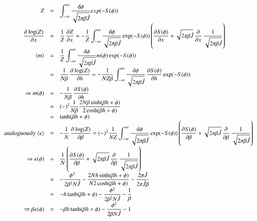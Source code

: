 \documentclass{scrartcl}
\begin{document}
\[\begin{array}{>{\displaystyle}r>{\displaystyle}c>{\displaystyle}l}

Z&=&\int_{-\infty}^{\infty}\frac{\mathrm{d} \phi}{\sqrt{2\pi\beta\hat{J}}}exp(-S(\phi))\\


\dpd{\log(Z)}{x}&=&\frac{1}{Z}\dpd{Z}{x}=
-\frac{1}{Z}\int_{-\infty}^{\infty}\frac{\mathrm{d} \phi}{\sqrt{2\pi\beta\hat{J}}}\exp(-S(\phi))\left( \dpd{S(\phi)}{x}+\sqrt{2\pi\beta\hat{J}}\dpd{}{x}\frac{1}{\sqrt{2\pi\beta\hat{J}}}\right) \\

\langle m\rangle&=&\frac{1}{Z}\int_{-\infty}^{\infty}\frac{\mathrm{d} \phi}{\sqrt{2\pi\beta\hat{J}}}m(\phi)\exp(-S(\phi))\\
&=&\frac{1}{N\beta}\dpd{\log(Z)}{h}=
-\frac{1}{NZ\beta}\int_{-\infty}^{\infty}\frac{\mathrm{d} \phi}{\sqrt{2\pi\beta\hat{J}}}\dpd{S(\phi)}{h}\exp(-S(\phi))\\

\Rightarrow m(\phi)&=&-\frac{1}{N\beta}\dpd{S(\phi)}{h}\\
&=&(-)^2\frac{1}{N\beta}\frac{2N\beta\sinh(\beta h+\phi)}{2\cosh(\beta h+\phi)}\\
&=&\tanh(\beta h+\phi)\\

\text{analoguously } \langle \epsilon\rangle&=&-\frac{1}{N}\dpd{\log(Z)}{\beta}=
(-)^2\frac{1}{NZ}\int_{-\infty}^{\infty}\frac{\mathrm{d} \phi}{\sqrt{2\pi\beta\hat{J}}}\exp(-S(\phi))
\left( \dpd{S(\phi)}{\beta}+\sqrt{2\pi\beta\hat{J}}\dpd{}{\beta}\frac{1}{\sqrt{2\pi\beta\hat{J}}}\right)\\

\Rightarrow \epsilon(\phi)&=&\frac{1}{N}\left( \dpd{S(\phi)}{\beta}+\sqrt{2\pi\beta\hat{J}}\dpd{}{\beta}\frac{1}{\sqrt{2\pi\beta\hat{J}}}\right)\\
&=&-\frac{\phi^2}{2\beta^2 N\hat{J}}-\frac{2Nh\sinh(\beta h+\phi)}{N2\cosh(\beta h+\phi)}-\frac{2\pi\hat{J}}{2\pi\hat{J}\beta}\\

&=&-h\tanh(\beta h+\phi)-\frac{\phi^2}{2\beta^2 N\hat{J}}-\frac{1}{\beta}\\

\Rightarrow \beta\epsilon(\phi)&=&-\beta h\tanh(\beta h+\phi)-\frac{\phi^2}{2\beta N\hat{J}}-1\\

\end{array}\]
\end{document}
